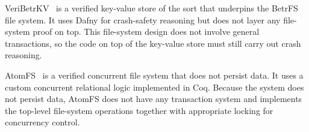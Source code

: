 VeriBetrKV~\cite{hance:veribetrkv} is a verified key-value store of
the sort that underpins the BetrFS~\cite{jannen:betrfs} file system. It uses Dafny for
crash-safety reasoning but does not layer any file-system proof on
top. This file-system design does not involve general transactions, so
the code on top of the key-value store must still carry out crash
reasoning.

AtomFS~\cite{zou:atomfs} is a verified concurrent file system that
does not persist data. It uses a custom concurrent relational logic
implemented in Coq.  Because the system does not persist data, AtomFS
does not have any transaction system and implements the top-level
file-system operations together with appropriate locking for
concurrency control.



